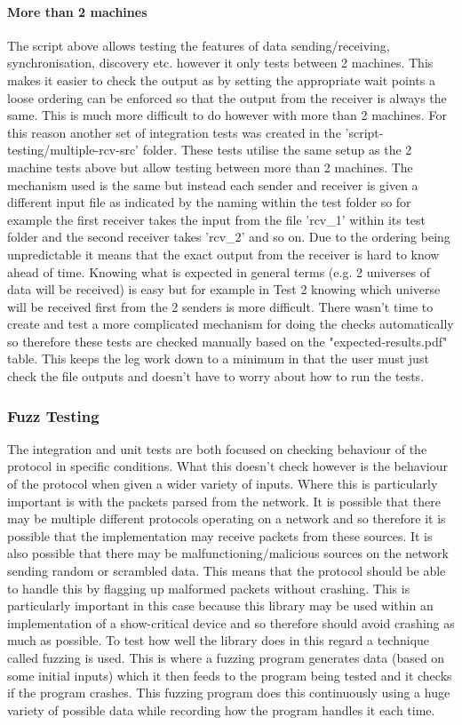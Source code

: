 \documentclass[11pt,a4paper]{article}
\begin{document}
\paragraph{More than 2 machines}
The script above allows testing the features of data sending/receiving, synchronisation, discovery etc. however it only tests between 2 machines. This makes it easier to check the output as by setting the appropriate wait points a loose ordering can be enforced so that the output from the receiver is always the same. This is much more difficult to do however with more than 2 machines. For this reason another set of integration tests was created in the 'script-testing/multiple-rcv-src' folder. These tests utilise the same setup as the 2 machine tests above but allow testing between more than 2 machines. The mechanism used is the same but instead each sender and receiver is given a different input file as indicated by the naming within the test folder so for example the first receiver takes the input from the file 'rcv\_1' within its test folder and the second receiver takes 'rcv\_2' and so on. Due to the ordering being unpredictable it means that the exact output from the receiver is hard to know ahead of time. Knowing what is expected in general terms (e.g. 2 universes of data will be received) is easy but for example in Test 2 knowing which universe will be received first from the 2 senders is more difficult. There wasn't time to create and test a more complicated mechanism for doing the checks automatically so therefore these tests are checked manually based on the "expected-results.pdf" table. This keeps the leg work down to a minimum in that the user must just check the file outputs and doesn't have to worry about how to run the tests.

\subsubsection{Fuzz Testing}
The integration and unit tests are both focused on checking behaviour of the protocol in specific conditions. What this doesn't check however is the behaviour of the protocol when given a wider variety of inputs. Where this is particularly important is with the packets parsed from the network. It is possible that there may be multiple different protocols operating on a network and so therefore it is possible that the implementation may receive packets from these sources. It is also possible that there may be malfunctioning/malicious sources on the network sending random or scrambled data. This means that the protocol should be able to handle this by flagging up malformed packets without crashing. This is particularly important in this case because this library may be used within an implementation of a show-critical device and so therefore should avoid crashing as much as possible. To test how well the library does in this regard a technique called fuzzing is used. This is where a fuzzing program generates data (based on some initial inputs) which it then feeds to the program being tested and it checks if the program crashes. This fuzzing program does this continuously using a huge variety of possible data while recording how the program handles it each time.\\
\end{document}
